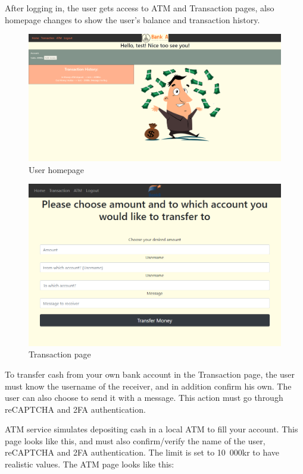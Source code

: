 After logging in, the user gets access to ATM and Transaction pages, also homepage changes to show the user’s balance and transaction history.

\begin{figure}[H]
    \centering
    \includegraphics[width=\textwidth]{pics/pic3homeuser.PNG}
    \caption{User homepage}
\end{figure}

\begin{figure}[H]
    \centering
    \includegraphics[width=\textwidth]{pics/pic 3.1.PNG}
    \caption{Transaction page}
\end{figure}

To transfer cash from your own bank account in the Transaction page, the user must know the username of the receiver, and in addition confirm his own. The user can also choose to send it with a message. This action must go through reCAPTCHA and 2FA authentication. 

ATM service simulates depositing cash in a local ATM to fill your account. This page looks like this, and must also confirm/verify the name of the user, reCAPTCHA and 2FA authentication. The limit is set to 10 000kr to have realistic values. The ATM page looks like this:

